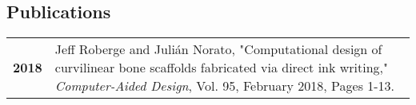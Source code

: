 \documentclass[darkhipster]{simplehipstercv}
\begin{document}
\begin{paracol}{2}
\begin{minipage}[t]{0.3\textwidth}
\section*{Publications}
\begin{tabular}{>{\footnotesize\bfseries}r >{\footnotesize}p{}}
    2018 & Jeff Roberge and Juli\'{a}n Norato, "Computational design of curvilinear bone scaffolds fabricated via direct ink writing," \emph{Computer-Aided Design}, Vol. 95, February 2018, Pages 1-13. \\
\end{tabular}
\bigskip
\bigskip
\end{minipage}


\end{paracol}
\end{document}
